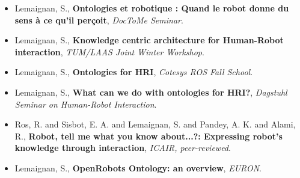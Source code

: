 \begin{itemize}
    \item{Lemaignan, S., \textbf{Ontologies et robotique : Quand le robot donne du sens à ce qu'il perçoit}, \textit{DocToMe Seminar}.}
    \item{Lemaignan, S., \textbf{Knowledge centric architecture for Human-Robot interaction}, \textit{TUM/LAAS Joint Winter Workshop}.}
    \item{Lemaignan, S., \textbf{Ontologies for HRI}, \textit{Cotesys ROS Fall School}.}
    \item{Lemaignan, S., \textbf{What can we do with ontologies for HRI?}, \textit{Dagstuhl Seminar on Human-Robot Interaction}.}
    \item{Ros, R. and Sisbot, E. A. and Lemaignan, S. and Pandey, A. K. and Alami, R., \textbf{Robot, tell me what you know about...?: Expressing robot's knowledge through interaction}, \textit{ICAIR, peer-reviewed}.}
    \item{Lemaignan, S., \textbf{OpenRobots Ontology: an overview}, \textit{EURON}.}
\end{itemize}
